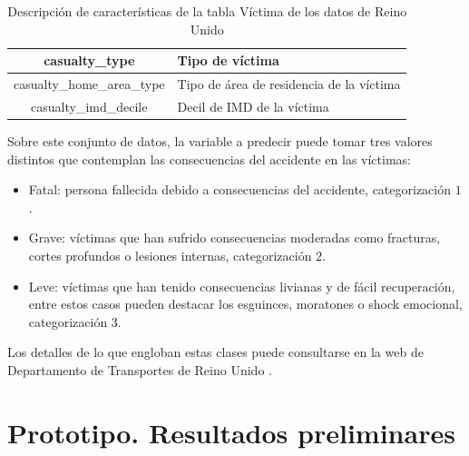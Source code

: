 \begin{table}[H]
\begin{center}
\begin{tabular}{|c|l|}
			casualty\_type & Tipo de víctima \\ \hline
			casualty\_home\_area\_type & Tipo de área de residencia de la víctima \\ \hline
			casualty\_imd\_decile & Decil de IMD de la víctima \\ \hline
		\end{tabular}
	\end{center}
	\caption{Descripción de características de la tabla Víctima de los datos de Reino Unido}
	\label{UK_CASUALTY_TABLE}
\end{table}

Sobre este conjunto de datos, la variable a predecir puede tomar tres valores distintos que contemplan las consecuencias del accidente en las víctimas:

\begin{itemize}
	\item Fatal: persona fallecida debido a consecuencias del accidente, categorización $1$.
	\item Grave: víctimas que han sufrido consecuencias moderadas como fracturas, cortes profundos o lesiones internas, categorización $2$.
	\item Leve: víctimas que han tenido consecuencias livianas y de fácil recuperación, entre estos casos pueden destacar los esguinces, moratones o shock emocional, categorización $3$.
\end{itemize}

Los detalles de lo que engloban estas clases puede consultarse en la web de Departamento de Transportes de Reino Unido \cite{UKDepartmentSeverityDefinition}.



\section{Prototipo. Resultados preliminares}




